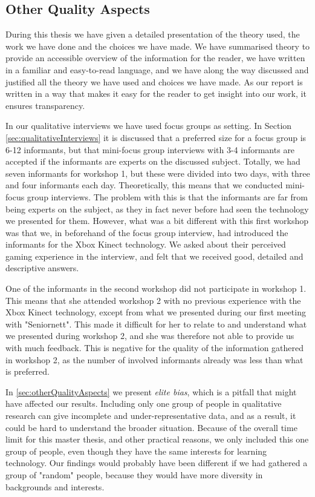 \subsection{Other Quality Aspects}
During this thesis we have given a detailed presentation of the theory used, the work we have done and the choices we have made. We have summarised theory to provide an accessible overview of the information for the reader, we have written in a familiar and easy-to-read language, and we have along the way discussed and justified all the theory we have used and choices we have made. As our report is written in a way that makes it easy for the reader to get insight into our work, it ensures transparency.

In our qualitative interviews we have used focus groups as setting. In Section \ref{sec:qualitativeInterviews} it is discussed that a preferred size for a focus group is 6-12 informants, but that mini-focus group interviews with 3-4 informants are accepted if the informants are experts on the discussed subject. Totally, we had seven informants for workshop 1, but these were divided into two days, with three and four informants each day. Theoretically, this means that we conducted mini-focus group interviews. The problem with this is that the informants are far from being experts on the subject, as they in fact never before had seen the technology we presented for them. However, what was a bit different with this first workshop was that we, in beforehand of the focus group interview, had introduced the informants for the Xbox Kinect technology. We asked about their perceived gaming experience in the interview, and felt that we received good, detailed and descriptive answers. 

One of the informants in the second workshop did not participate in workshop 1. This means that she attended workshop 2 with no previous experience with the Xbox Kinect technology, except from what we presented during our first meeting with "Seniornett". This made it difficult for her to relate to and understand what we presented during workshop 2, and she was therefore not able to provide us with much feedback. This is negative for the quality of the information gathered in workshop 2, as the number of involved informants already was less than what is preferred. 

In \ref{sec:otherQualityAspects} we present \emph{elite bias}, which is a pitfall that might have affected our results. Including only one group of people in qualitative research can give incomplete and under-representative data, and as a result, it could be hard to understand the broader situation. Because of the overall time limit for this master thesis, and other practical reasons, we only included this one group of people, even though they have the same interests for learning technology. Our findings would probably have been different if we had gathered a group of "random" people, because they would have more diversity in backgrounds and interests.

